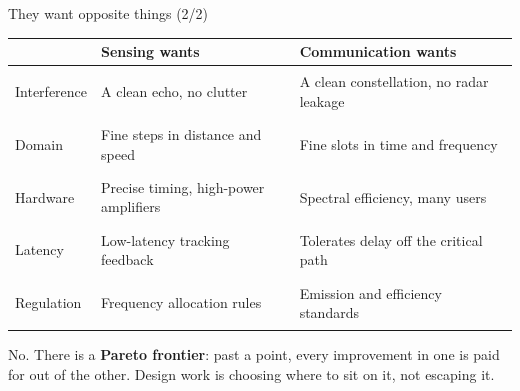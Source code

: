 \begin{frame}{They want opposite things (2/2)}
  \vspace{0.2em}
  \scriptsize
  \setlength{\tabcolsep}{4pt}
  \renewcommand{\arraystretch}{1.35}
  \begin{tabularx}{\textwidth}{>{\bfseries\raggedright\arraybackslash}p{1.55cm}
      >{\raggedright\arraybackslash}X >{\raggedright\arraybackslash}X}
    \toprule
    & \textcolor{coreorange}{\textbf{Sensing wants}} & \textcolor{ranblue}{\textbf{Communication wants}} \\
    \midrule
    Interference & A clean echo, no clutter & A clean constellation, no radar leakage \\
    Domain     & Fine steps in distance and speed & Fine slots in time and frequency \\
    Hardware   & Precise timing, high-power amplifiers & Spectral efficiency, many users \\
    Latency    & Low-latency tracking feedback & Tolerates delay off the critical path \\
    Regulation & Frequency allocation rules & Emission and efficiency standards \\
    \bottomrule
  \end{tabularx}

  \vspace{0.6em}
     {No. There is a \textbf{Pareto frontier}: past a point, every improvement in
      one is paid for out of the other. Design work is choosing where to sit on
      it, not escaping it.}
\end{frame}

